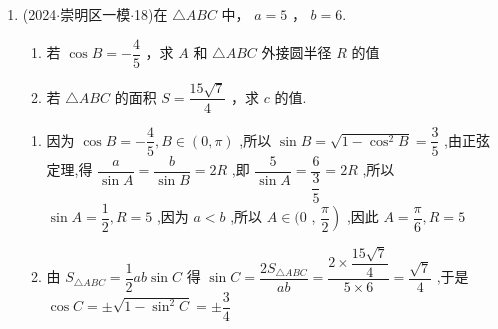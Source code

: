 \begin{enumerate}
    \item (2024$\cdot$崇明区一模$\cdot$18)在 $\bigtriangleup  {ABC}$ 中， $a = 5$ ， $b = 6$.
    \begin{enumerate}
        \item 若 $\cos B =  - \dfrac{4}{5}$ ，求 $A$ 和 $\bigtriangleup  {ABC}$ 外接圆半径 $R$ 的值
        \item 若 $\bigtriangleup  {ABC}$ 的面积 $S = \dfrac{{15}\sqrt{7}}{4}$ ，求 $c$ 的值.
    \end{enumerate}
    \begin{jieda}
        \begin{enumerate}
            \item 因为 $\cos B =  - \dfrac{4}{5},B \in  \left( {0,\pi }\right)$ ,所以 $\sin B =  \sqrt{1 - {\cos }^{2}B} = \dfrac{3}{5}$ ,由正弦定理,得 $\dfrac{a}{\sin A} = \dfrac{b}{\sin B} = {2R}$ ,即 $\dfrac{5}{\sin A} =  \dfrac{6}{\dfrac{3}{5}} = {2R}$ ,所以 $\sin A = \dfrac{1}{2},R = 5$ ,因为 $a < b$ ,所以 $A \in  (0$ , $\left. \dfrac{\pi }{2}\right)$ ,因此 $A = \dfrac{\pi }{6},R = 5$
            \item 由 ${S}_{\bigtriangleup {ABC}} = \dfrac{1}{2}{ab}\sin C$ 得 $\sin C = \dfrac{2{S}_{\bigtriangleup {ABC}}}{ab} = \dfrac{2 \times  \dfrac{{15}\sqrt{7}}{4}}{5 \times  6} =  \dfrac{\sqrt{7}}{4}$ ,于是 $\cos C =  \pm  \sqrt{1 - {\sin }^{2}C} =  \pm  \dfrac{3}{4}$
        \end{enumerate}
    \end{jieda}


\end{enumerate}
